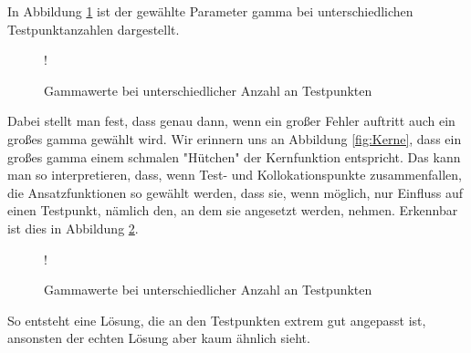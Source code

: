 In Abbildung \ref{fig:testpunkte-gamma} ist der gewählte Parameter gamma bei unterschiedlichen Testpunktanzahlen dargestellt.
\begin{figure}[ht]
\centering
\resizebox {\columnwidth} {!} {

}
\caption{Gammawerte bei unterschiedlicher Anzahl an Testpunkten}
\label{fig:testpunkte-gamma}
\end{figure}
Dabei stellt man fest, dass genau dann, wenn ein großer Fehler auftritt auch ein großes gamma gewählt wird. Wir erinnern uns an Abbildung \ref{fig:Kerne}, dass ein großes gamma einem schmalen "Hütchen"  der Kernfunktion entspricht. Das kann man so interpretieren, dass, wenn Test- und Kollokationspunkte zusammenfallen, die Ansatzfunktionen so gewählt werden, dass sie, wenn möglich, nur Einfluss auf einen Testpunkt, nämlich den, an dem sie angesetzt werden, nehmen. Erkennbar ist dies in Abbildung \ref{fig:overfitting}.
\begin{figure}[ht]
\centering
\resizebox {\columnwidth} {!} {

}
\caption{Gammawerte bei unterschiedlicher Anzahl an Testpunkten}
\label{fig:overfitting}
\end{figure}

So entsteht eine Lösung, die an den Testpunkten extrem gut angepasst ist, ansonsten der echten Lösung aber kaum ähnlich sieht.
